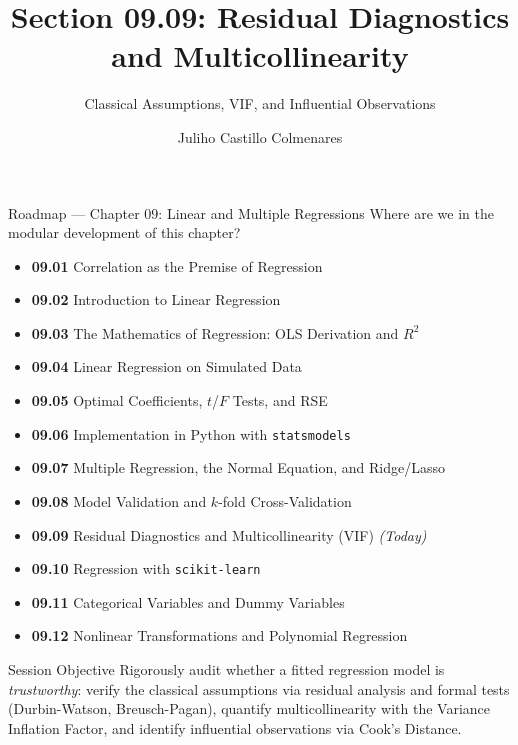 \documentclass[10pt, aspectratio=169]{beamer}
\title[Regression Diagnostics]{Section 09.09: Residual Diagnostics and Multicollinearity}
\subtitle{Classical Assumptions, VIF, and Influential Observations}
\author[J. Castillo Colmenares]{Juliho Castillo Colmenares}
\institute{Tecnológico de Monterrey}
\date{\vspace{-1.5cm}}
\begin{document}
\begin{frame}[plain]
  \titlepage
\end{frame}

\begin{frame}{Roadmap --- Chapter 09: Linear and Multiple Regressions}
  \scriptsize
  Where are we in the modular development of this chapter?
  \begin{itemize}\itemsep=0.02em
    \item \textbf{09.01} Correlation as the Premise of Regression
    \item \textbf{09.02} Introduction to Linear Regression
    \item \textbf{09.03} The Mathematics of Regression: OLS Derivation and $R^2$
    \item \textbf{09.04} Linear Regression on Simulated Data
    \item \textbf{09.05} Optimal Coefficients, $t$/$F$ Tests, and RSE
    \item \textbf{09.06} Implementation in Python with \texttt{statsmodels}
    \item \textbf{09.07} Multiple Regression, the Normal Equation, and Ridge/Lasso
    \item \textbf{09.08} Model Validation and $k$-fold Cross-Validation
    \item \textbf{09.09} Residual Diagnostics and Multicollinearity (VIF) \emph{(Today)}
    \item \textbf{09.10} Regression with \texttt{scikit-learn}
    \item \textbf{09.11} Categorical Variables and Dummy Variables
    \item \textbf{09.12} Nonlinear Transformations and Polynomial Regression
  \end{itemize}
  \pause
  \vspace{-0.05cm}
  \begin{block}{Session Objective}
    Rigorously audit whether a fitted regression model is \emph{trustworthy}: verify the classical assumptions via residual analysis and formal tests (Durbin-Watson, Breusch-Pagan), quantify multicollinearity with the Variance Inflation Factor, and identify influential observations via Cook's Distance.
  \end{block}
\end{frame}
\end{document}
